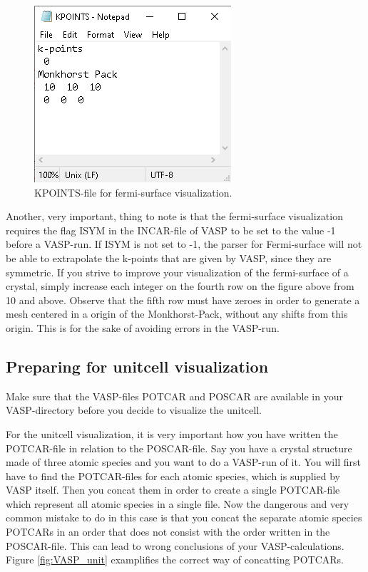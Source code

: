 \begin{figure}[H]
    \centering
    \includegraphics[scale = 0.55]{Images/usermanual_fermisurface.png}
    \caption{KPOINTS-file for fermi-surface visualization.}
    \label{fig:VASP_fermisurface}
\end{figure}

Another, very important, thing to note is that the fermi-surface visualization requires the flag ISYM in the INCAR-file of VASP to be set to the value -1 before a VASP-run. If ISYM is not set to -1, the parser for Fermi-surface will not be able to extrapolate the k-points that are given by VASP, since they are symmetric. If you strive to improve your visualization of the fermi-surface of a crystal, simply increase each integer on the fourth row on the figure above from 10 and above. Observe that the fifth row must have zeroes in order to generate a mesh centered in a origin of the Monkhorst-Pack, without any shifts from this origin. This is for the sake of avoiding errors in the VASP-run.

\subsection{Preparing for unitcell visualization}
\label{section_unit}

Make sure that the VASP-files POTCAR and POSCAR are available in your VASP-directory before you decide to visualize the unitcell. 

For the unitcell visualization, it is very important how you have written the POTCAR-file in relation to the POSCAR-file. Say you have a crystal structure made of three atomic species and you want to do a VASP-run of it. You will first have to find the POTCAR-files for each atomic species, which is supplied by VASP itself. Then you concat them in order to create a single POTCAR-file which represent all atomic species in a single file. Now the dangerous and very common mistake to do in this case is that you concat the separate atomic species POTCARs in an order that does not consist with the order written in the POSCAR-file. This can lead to wrong conclusions of your VASP-calculations. Figure \ref{fig:VASP_unit} examplifies the correct way of concatting POTCARs.

